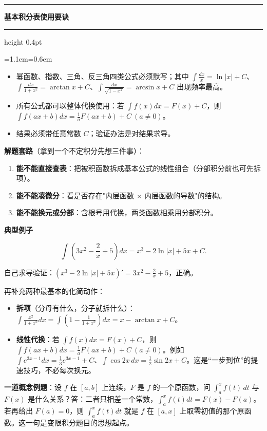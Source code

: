 \documentclass[11pt,openany,UTF8]{ctexbook}
\newcommand{\callouthead}[2]{%
  \par\addvspace{7pt}\noindent
  {\color{#1}\rule[-0.15em]{3pt}{1.05em}}\hspace{0.5em}%
  {\bfseries\color{#1}#2}\par\nobreak\vspace{-0.35em}%
  {\color{rulesep}\hrule height 0.4pt}\nobreak\vspace{0.45em}%
  \begingroup\small\setlength{\parindent}{0pt}%
  \leftskip=1.1em\rightskip=0.6em\noindent\ignorespaces}
\newcommand{\calloutend}{\par\endgroup\addvspace{7pt}}
\newenvironment{callkey}[1]{\callouthead{keybar}{#1}}{\calloutend}
\begin{document}
\begin{callkey}{基本积分表使用要诀}
\begin{itemize}
\item 幂函数、指数、三角、反三角四类公式必须默写；其中 $\int\frac{dx}{x}=\ln\lvert x\rvert+C$、$\int\frac{dx}{1+x^2}=\arctan x+C$、$\int\frac{dx}{\sqrt{1-x^2}}=\arcsin x+C$ 出现频率最高。
\item 所有公式都可以整体代换使用：若 $\int f(x)dx=F(x)+C$，则 $\int f(ax+b)dx=\frac{1}{a}F(ax+b)+C\ (a\neq0)$。
\item 结果必须带任意常数 $C$；验证办法是对结果求导。
\end{itemize}
\end{callkey}

\textbf{解题套路}（拿到一个不定积分先想三件事）：

\begin{enumerate}
\item \textbf{能不能直接查表}：把被积函数拆成基本公式的线性组合（分部积分前也可先拆项）。
\item \textbf{能不能凑微分}：看是否存在"内层函数 $\times$ 内层函数的导数"的结构。
\item \textbf{能不能换元或分部}：含根号用代换，两类函数相乘用分部积分。
\end{enumerate}
\textbf{典型例子}

\[\int\left(3x^2-\frac{2}{x}+5\right)dx=x^3-2\ln\lvert x\rvert+5x+C.\]

自己求导验证：$(x^3-2\ln\lvert x\rvert+5x)'=3x^2-\frac{2}{x}+5$，正确。

再补充两种最基本的化简动作：

\begin{itemize}
\item \textbf{拆项}（分母有什么，分子就拆什么）：$\displaystyle\int\frac{x^2}{1+x^2}dx=\int\left(1-\frac{1}{1+x^2}\right)dx=x-\arctan x+C$。
\item \textbf{线性代换}：若 $\int f(x)dx=F(x)+C$，则 $\int f(ax+b)dx=\frac{1}{a}F(ax+b)+C\ (a\neq0)$。例如 $\int e^{3x-1}dx=\frac{1}{3}e^{3x-1}+C$、$\int\cos 2x\,dx=\frac{1}{2}\sin 2x+C$。这是“一步到位”的提速技巧，不必每次换元。
\end{itemize}
\textbf{一道概念例题}：设 $f$ 在 $[a,b]$ 上连续，$F$ 是 $f$ 的一个原函数，问 $\int_a^xf(t)\,dt$ 与 $F(x)$ 是什么关系？答：二者只相差一个常数，$\int_a^xf(t)dt=F(x)-F(a)$。若再给出 $F(a)=0$，则 $\int_a^xf(t)dt$ 就是 $f$ 在 $[a,x]$ 上取零初值的那个原函数。这一句是变限积分题目的思想起点。
\end{document}
